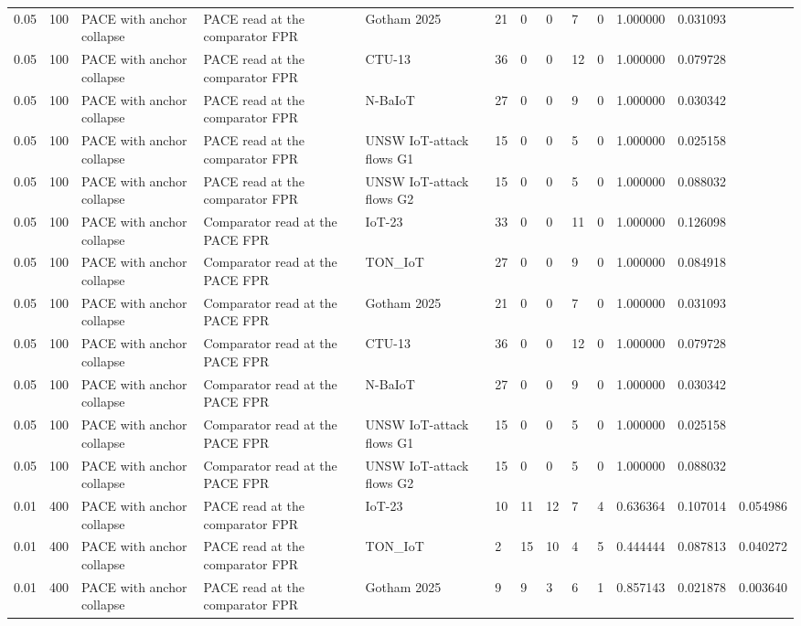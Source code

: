 \begin{tabular}{lllllllllllll}
0.05 & 100 & PACE with anchor collapse & PACE read at the comparator FPR & Gotham 2025 & 21 & 0 & 0 & 7 & 0 & 1.000000 & 0.031093 &  \\
0.05 & 100 & PACE with anchor collapse & PACE read at the comparator FPR & CTU-13 & 36 & 0 & 0 & 12 & 0 & 1.000000 & 0.079728 &  \\
0.05 & 100 & PACE with anchor collapse & PACE read at the comparator FPR & N-BaIoT & 27 & 0 & 0 & 9 & 0 & 1.000000 & 0.030342 &  \\
0.05 & 100 & PACE with anchor collapse & PACE read at the comparator FPR & UNSW IoT-attack flows G1 & 15 & 0 & 0 & 5 & 0 & 1.000000 & 0.025158 &  \\
0.05 & 100 & PACE with anchor collapse & PACE read at the comparator FPR & UNSW IoT-attack flows G2 & 15 & 0 & 0 & 5 & 0 & 1.000000 & 0.088032 &  \\
0.05 & 100 & PACE with anchor collapse & Comparator read at the PACE FPR & IoT-23 & 33 & 0 & 0 & 11 & 0 & 1.000000 & 0.126098 &  \\
0.05 & 100 & PACE with anchor collapse & Comparator read at the PACE FPR & TON\_IoT & 27 & 0 & 0 & 9 & 0 & 1.000000 & 0.084918 &  \\
0.05 & 100 & PACE with anchor collapse & Comparator read at the PACE FPR & Gotham 2025 & 21 & 0 & 0 & 7 & 0 & 1.000000 & 0.031093 &  \\
0.05 & 100 & PACE with anchor collapse & Comparator read at the PACE FPR & CTU-13 & 36 & 0 & 0 & 12 & 0 & 1.000000 & 0.079728 &  \\
0.05 & 100 & PACE with anchor collapse & Comparator read at the PACE FPR & N-BaIoT & 27 & 0 & 0 & 9 & 0 & 1.000000 & 0.030342 &  \\
0.05 & 100 & PACE with anchor collapse & Comparator read at the PACE FPR & UNSW IoT-attack flows G1 & 15 & 0 & 0 & 5 & 0 & 1.000000 & 0.025158 &  \\
0.05 & 100 & PACE with anchor collapse & Comparator read at the PACE FPR & UNSW IoT-attack flows G2 & 15 & 0 & 0 & 5 & 0 & 1.000000 & 0.088032 &  \\
0.01 & 400 & PACE with anchor collapse & PACE read at the comparator FPR & IoT-23 & 10 & 11 & 12 & 7 & 4 & 0.636364 & 0.107014 & 0.054986 \\
0.01 & 400 & PACE with anchor collapse & PACE read at the comparator FPR & TON\_IoT & 2 & 15 & 10 & 4 & 5 & 0.444444 & 0.087813 & 0.040272 \\
0.01 & 400 & PACE with anchor collapse & PACE read at the comparator FPR & Gotham 2025 & 9 & 9 & 3 & 6 & 1 & 0.857143 & 0.021878 & 0.003640 \\

\end{tabular}
